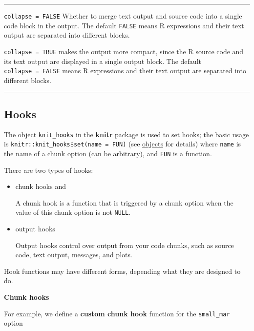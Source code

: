\documentclass[
  a4paper,
  twoside,
  openright]{book}
\newenvironment{Shaded}{\begin{snugshade}}{\end{snugshade}}
\newcommand{\AttributeTok}[1]{\textcolor[rgb]{0.13,0.29,0.53}{#1}}
\newcommand{\CommentTok}[1]{\textcolor[rgb]{0.56,0.35,0.01}{\textit{#1}}}
\newcommand{\ControlFlowTok}[1]{\textcolor[rgb]{0.13,0.29,0.53}{\textbf{#1}}}
\newcommand{\DecValTok}[1]{\textcolor[rgb]{0.00,0.00,0.81}{#1}}
\newcommand{\FunctionTok}[1]{\textcolor[rgb]{0.13,0.29,0.53}{\textbf{#1}}}
\newcommand{\NormalTok}[1]{#1}
\newcommand{\SpecialCharTok}[1]{\textcolor[rgb]{0.81,0.36,0.00}{\textbf{#1}}}
\theoremstyle{definition}
\theoremstyle{definition}
\theoremstyle{definition}
\theoremstyle{definition}
\theoremstyle{remark}
\begin{document}
\begin{center}\rule{0.5\linewidth}{0.5pt}\end{center}

\texttt{collapse\ =\ FALSE} Whether to merge text output and source code into a single code block in the output. The default \texttt{FALSE} means R expressions and their text output are separated into different blocks.

\texttt{collapse\ =\ TRUE} makes the output more compact, since the R source code and its text output are displayed in a single output block. The default \texttt{collapse\ =\ FALSE} means R expressions and their text output are separated into different blocks.

\begin{center}\rule{0.5\linewidth}{0.5pt}\end{center}

\subsection*{Hooks}\label{hooks}

The object \texttt{knit\_hooks} in the \textbf{knitr} package is used to set hooks; the basic usage is \texttt{knitr::knit\_hooks\$set(name\ =\ FUN)} (see \href{https://yihui.org/knitr/objects/}{objects} for details) where \texttt{name} is the name of a chunk option (can be arbitrary), and \texttt{FUN} is a function.

There are two types of hooks:

\begin{itemize}
\item
  chunk hooks and

  A chunk hook is a function that is triggered by a chunk option when the value of this chunk option is not \texttt{NULL}.
\item
  output hooks

  Output hooks control over output from your code chunks, such as source code, text output, messages, and plots.
\end{itemize}

Hook functions may have different forms, depending what they are designed to do.

\textbf{Chunk hooks}

For example, we define a \textbf{custom chunk hook} function for the \texttt{small\_mar} option

\begin{Shaded}
\end{Shaded}
\end{document}
